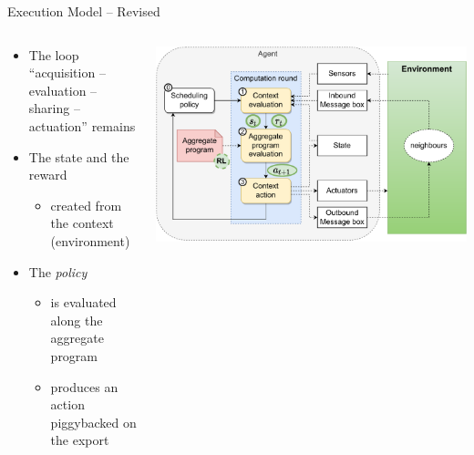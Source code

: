 \documentclass[9pt, aspectratio=169, handout]{beamer}
\begin{document}
\begin{frame}{Execution Model -- Revised}
  \begin{columns}
    \begin{column}{0.49\textwidth}
      \begin{card}
        \begin{itemize}
          \item The loop ``acquisition -- evaluation -- sharing -- actuation'' remains
          \item The state and the reward
          \begin{itemize}
            \item created from the context (environment)
          \end{itemize}
          \item The \emph{policy}
          \begin{itemize}
            \item is evaluated along the aggregate program
            \item produces an action piggybacked on the export
          \end{itemize}
        \end{itemize}
      \end{card}
    \end{column}
    \begin{column}{0.57\textwidth}  
      \begin{cardTiny}
        \includegraphics[width=\textwidth]{img/aggregate-agent-control-architecture-rl.pdf}    
      \end{cardTiny}
    \end{column}
  \end{columns}
\end{frame}
\end{document}
